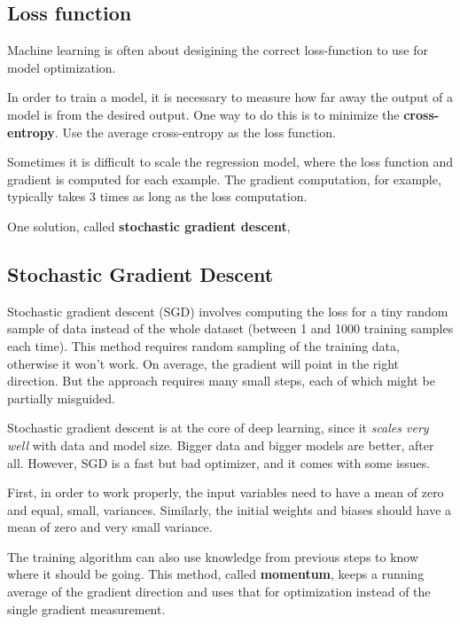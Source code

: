 \subsection{Loss function}

Machine learning is often about desigining the correct loss-function to use for model optimization. 

In order to train a model, it is necessary to measure how far away the output of a model is from the desired output. One way to do this is to minimize the \textbf{cross-entropy}. Use the average cross-entropy as the loss function.

Sometimes it is difficult to scale the regression model, where the loss function and gradient is computed for each example. The gradient computation, for example, typically takes 3 times as long as the loss computation.

One solution, called \textbf{stochastic gradient descent}, 

\subsection{Stochastic Gradient Descent}

Stochastic gradient descent (SGD) involves computing the loss for a tiny random sample of data instead of the whole dataset (between 1 and 1000 training samples each time). This method requires random sampling of the training data, otherwise it won't work. On average, the gradient will point in the right direction. But the approach requires many small steps, each of which might be partially misguided. 

Stochastic gradient descent is at the core of deep learning, since it \textit{scales very well} with data and model size. Bigger data and bigger models are better, after all. However, SGD is a fast but bad optimizer, and it comes with some issues.

First, in order to work properly, the input variables need to have a mean of zero and equal, small, variances. Similarly, the initial weights and biases should have a mean of zero and very small variance. 

The training algorithm can also use knowledge from previous steps to know where it should be going. This method, called \textbf{momentum}, keeps a running average of the gradient direction and uses that for optimization instead of the single gradient measurement. 


